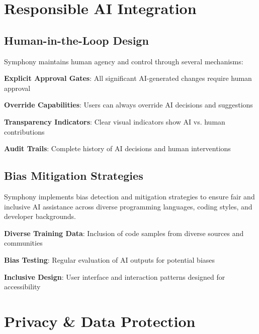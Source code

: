\section*{Responsible AI Integration}

\subsection*{Human-in-the-Loop Design}
Symphony maintains human agency and control through several mechanisms:

\begin{compactlist}
    \item \textbf{Explicit Approval Gates}: All significant AI-generated changes require human approval
    \item \textbf{Override Capabilities}: Users can always override AI decisions and suggestions
    \item \textbf{Transparency Indicators}: Clear visual indicators show AI vs. human contributions
    \item \textbf{Audit Trails}: Complete history of AI decisions and human interventions
\end{compactlist}

\subsection*{Bias Mitigation Strategies}

\begin{successbox}
Symphony implements  bias detection and mitigation strategies to ensure fair and inclusive AI assistance across diverse programming languages, coding styles, and developer backgrounds.
\end{successbox}

\begin{expandedlist}
    \item \textbf{Diverse Training Data}: Inclusion of code samples from diverse sources and communities
    \item \textbf{Bias Testing}: Regular evaluation of AI outputs for potential biases
    \item \textbf{Inclusive Design}: User interface and interaction patterns designed for accessibility
\end{expandedlist}

\section*{Privacy \& Data Protection}

